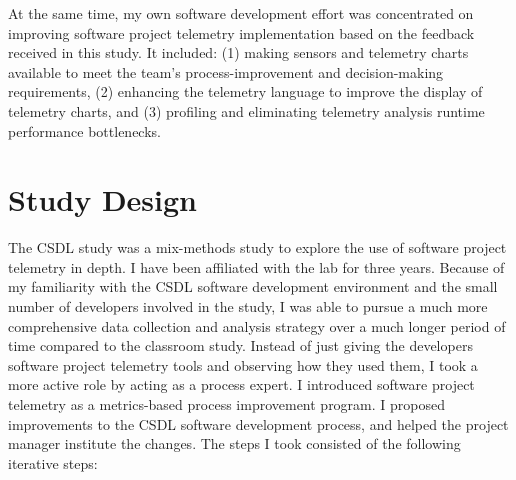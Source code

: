 At the same time, my own software development effort was concentrated on improving software project telemetry implementation based on the feedback received in this study. It included: (1) making sensors and telemetry charts available to meet the team's process-improvement and decision-making requirements, (2) enhancing the telemetry language to improve the display of telemetry charts, and (3) profiling and eliminating telemetry analysis runtime performance bottlenecks.









\section{Study Design}  \label{EvaluationInCSDL:StudyDesign}


The CSDL study was a mix-methods study to explore the use of software project telemetry in depth.
I have been affiliated with the lab for three years. Because of my familiarity with the CSDL software development environment and the small number of developers involved in the study, I was able to pursue a much more comprehensive data collection and analysis strategy over a much longer period of time compared to the classroom study. Instead of just giving the developers software project telemetry tools and observing how they used them, I took a more active role by acting as a process expert. I introduced software project telemetry as a metrics-based process improvement program. I proposed improvements to the CSDL software development process, and helped the project manager institute the changes. The steps I took consisted of the following iterative steps: %

